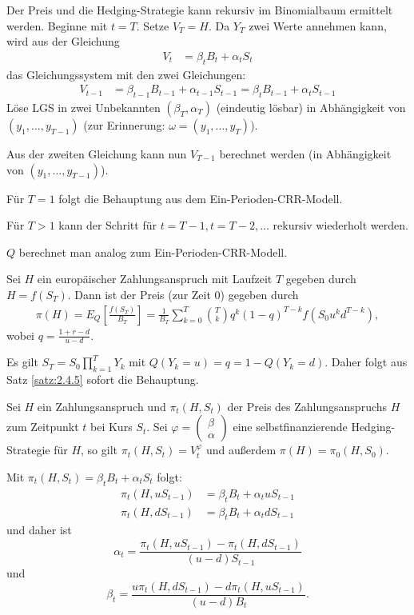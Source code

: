 \documentclass[a4paper,twoside,DIV15,BCOR12mm]{scrbook}
\begin{document}
 \begin{beweis}
 Der Preis und die Hedging-Strategie kann rekursiv im Binomialbaum ermittelt werden. Beginne mit $t=T$. Setze $V_T=H$. Da $Y_T$ zwei Werte annehmen kann, wird aus der Gleichung 
 \begin{align*}
 V_t&= \beta_t B_t+ \alpha_t S_t
 \end{align*}
das Gleichungssystem mit den zwei Gleichungen:
 \begin{align*}
 V_{t-1}&= \beta_{t-1}B_{t-1}+\alpha_{t-1}S_{t-1}=\beta_tB_{t-1}+\alpha_tS_{t-1}
 \end{align*}
 Löse LGS in zwei Unbekannten $(\beta_T, \alpha_T)$ (eindeutig lösbar) in Abhängigkeit von $(y_1,\ldots,y_{T-1})$ (zur Erinnerung: $\omega=(y_1,\ldots,y_T)$).

 Aus der zweiten Gleichung kann nun $V_{T-1}$ berechnet werden (in Abhängigkeit von $(y_1,\ldots, y_{T-1})$).

 Für $T=1$ folgt die Behauptung aus dem Ein-Perioden-CRR-Modell.

 Für $T>1$ kann der Schritt für $t=T-1, t=T-2, \ldots$ rekursiv wiederholt werden. 

 $Q$ berechnet man analog zum Ein-Perioden-CRR-Modell.
 \end{beweis}
 \begin{korollar}
 Sei $H$ ein europäischer Zahlungsanspruch mit Laufzeit $T$ gegeben durch $H=f(S_T)$. Dann ist der Preis (zur Zeit 0) gegeben durch
 \begin{align*}
 \pi(H)=E_Q\left[\frac{f(S_T)}{B_T}\right]=\frac{1}{B_T} \sum\limits_{k=0}^T \binom{T}{k} q^k (1-q)^{T-k} f(S_0u^kd^{T-k}),
 \end{align*}
wobei $q=\frac{1+r-d}{u-d}$.\label{kor:2.4.6}
 \end{korollar}
 \begin{beweis}
 Es gilt $S_T=S_0 \prod_{k=1}^T Y_k$ mit $Q(Y_k=u)=q=1-Q(Y_k=d)$. Daher folgt aus Satz \ref{satz:2.4.5} sofort die Behauptung.
 \end{beweis}
 
\begin{bemerkung}
Sei $H$ ein Zahlungsanspruch und $\pi_t(H,S_t)$ der Preis des Zahlungsanspruchs $H$ zum Zeitpunkt $t$ bei Kurs $S_t$. Sei 
$\varphi=\left(\begin{smallmatrix} \beta \\ \alpha \end{smallmatrix}\right)$ 
eine selbstfinanzierende Hedging-Strategie für $H$, so gilt $\pi_t(H,S_t)=V_t^\varphi$ und außerdem $\pi(H) = \pi_0(H,S_0)$.

Mit $\pi_t(H,S_t) = \beta_t B_t + \alpha_t S_t$ folgt:
\begin{align*}
\pi_t(H,u S_{t-1}) &= \beta_t B_t + \alpha_t u S_{t-1} \\
\pi_t(H,d S_{t-1}) &= \beta_t B_t + \alpha_t d S_{t-1}
\end{align*}
und daher ist
\[
\alpha_t = \frac{\pi_t(H,uS_{t-1}) - \pi_t(H,dS_{t-1})}{(u-d) S_{t-1}}
\]
und
\[
\beta_t = \frac{u\pi_t(H,d S_{t-1}) - d\pi_t(H,uS_{t-1})}{(u-d)B_t}.
\]
\end{bemerkung}
\end{document}

